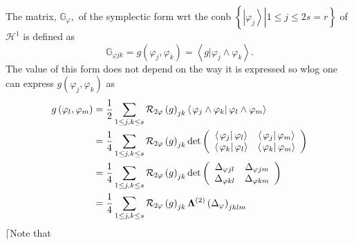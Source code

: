 \documentclass[aps,preprint]{revtex4}%
\begin{document}
The matrix, $\mathbb{G}_{\varphi},$ of the symplectic form wrt the conb
$\left\{  \left.  \left\vert \varphi_{j}\right\rangle \right\vert 1\leq
j\leq2s=r\right\}  $ of $\mathcal{H}^{1}$ is defined as
\begin{equation}
\mathbb{G}_{\varphi jk}=g\left(  \varphi_{j},\varphi_{k}\right)  =\left\langle
\left.  g\right\vert \varphi_{j}\wedge\varphi_{k}\right\rangle .
\end{equation}
The value of this form does not depend on the way it is expressed so wlog one
can express $g\left(  \varphi_{j},\varphi_{k}\right)  $ as
\begin{align}
g\left(  \varphi_{l},\varphi_{m}\right)   &  =\frac{1}{2}\sum_{1\leq j,k\leq
s}\mathcal{R}_{2\varphi}\left(  g\right)  _{jk}\left\langle \left.
\varphi_{j}\wedge\varphi_{k}\right\vert \varphi_{l}\wedge\varphi
_{m}\right\rangle \\
&  =\frac{1}{4}\sum_{1\leq j,k\leq s}\mathcal{R}_{2\varphi}\left(  g\right)
_{jk}\det\left(
\begin{array}
[c]{cc}%
\left\langle \left.  \varphi_{j}\right\vert \varphi_{l}\right\rangle  &
\left\langle \left.  \varphi_{j}\right\vert \varphi_{m}\right\rangle \\
\left\langle \left.  \varphi_{k}\right\vert \varphi_{l}\right\rangle  &
\left\langle \left.  \varphi_{k}\right\vert \varphi_{m}\right\rangle
\end{array}
\right) \\
&  =\frac{1}{4}\sum_{1\leq j,k\leq s}\mathcal{R}_{2\varphi}\left(  g\right)
_{jk}\det\left(
\begin{array}
[c]{cc}%
\Delta_{\varphi jl} & \Delta_{\varphi jm}\\
\Delta_{\varphi kl} & \Delta_{\varphi km}%
\end{array}
\right) \\
&  =\frac{1}{4}\sum_{1\leq j,k\leq s}\mathcal{R}_{2\varphi}\left(  g\right)
_{jk}\mathbf{\Lambda}^{\left(  2\right)  }\left(  \Delta_{\varphi}\right)
_{jklm}%
\end{align}
$\lceil$Note that
\end{document}
